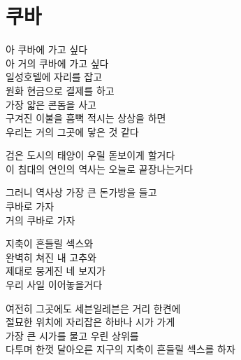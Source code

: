 \hypertarget{uxcfe0uxbc14}{%

\chapter{쿠바}\label{uxcfe0uxbc14}}



아 쿠바에 가고 싶다\\

아 거의 쿠바에 가고 싶다\\

일성호텔에 자리를 잡고\\

원화 현금으로 결제를 하고\\

가장 얇은 콘돔을 사고\\

구겨진 이불을 흠뻑 적시는 상상을 하면\\

우리는 거의 그곳에 닿은 것 같다



검은 도시의 태양이 우릴 돋보이게 할거다\\

이 침대의 연인의 역사는 오늘로 끝장나는거다



그러니 역사상 가장 큰 돈가방을 들고\\

쿠바로 가자\\

거의 쿠바로 가자



지축이 흔들릴 섹스와\\

완벽히 쳐진 내 고추와\\

제대로 뭉게진 네 보지가\\

우리 사일 이어놓을거다



여전히 그곳에도 세븐일레븐은 거리 한켠에\\

절묘한 위치에 자리잡은 하바나 시가 가게\\

가장 큰 시가를 물고 우린 상위를\\

다투며 한껏 달아오른 지구의 지축이 흔들릴 섹스를 하자



